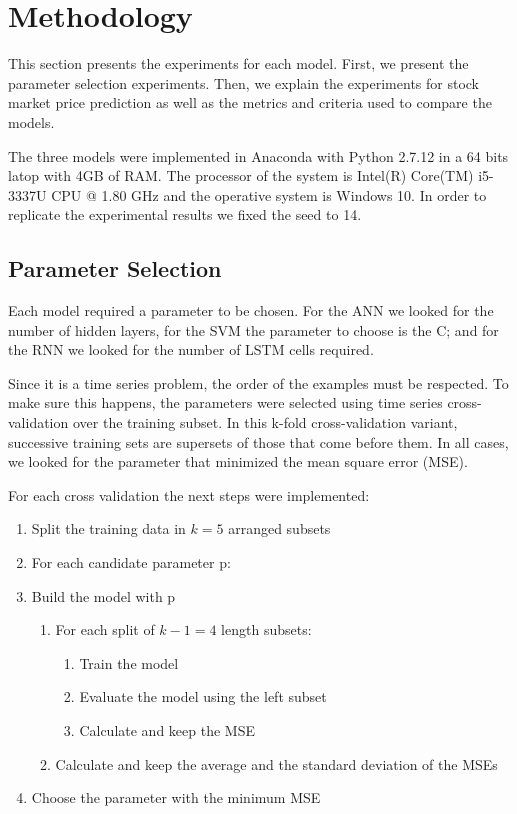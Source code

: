 \chapter{Methodology}

\label{ch:methodology}

This section presents the experiments for each model. First, we present the parameter selection experiments. Then, we explain the experiments for stock market price prediction as well as the metrics and criteria used to compare the models.

The three models were implemented in Anaconda with Python 2.7.12 in a 64 bits latop with 4GB of RAM. The processor of the system is Intel(R) Core(TM) i5-3337U CPU @ 1.80 GHz and the operative system is Windows 10. In order to replicate the experimental results we fixed the seed to 14. 
\section{Parameter Selection}

Each model required a parameter to be chosen. For the ANN we looked for the number of hidden layers, for the SVM the parameter to choose is the C; and for the RNN we looked for the number of LSTM cells required.

Since it is a time series problem, the order of the examples must be respected. To make sure this happens, the parameters were selected using time series cross-validation over the training subset. In this k-fold cross-validation variant, successive training sets are supersets of those that come before them. In all cases, we looked for the parameter that minimized the mean square error (MSE). 

For each cross validation the next steps were implemented:
\begin{enumerate}
\item Split the training data in $k=5$ arranged subsets
\item For each candidate parameter p:
\item  Build the model with p
\begin{enumerate}
\item For each split of $k-1=4$ length subsets:
\begin{enumerate}
\item Train the model
\item Evaluate the model using the left subset
\item Calculate and keep the MSE
\end{enumerate}
\item Calculate and keep the average and the standard deviation of the MSEs
\end{enumerate}
\item Choose the parameter with the minimum MSE
\end{enumerate}

